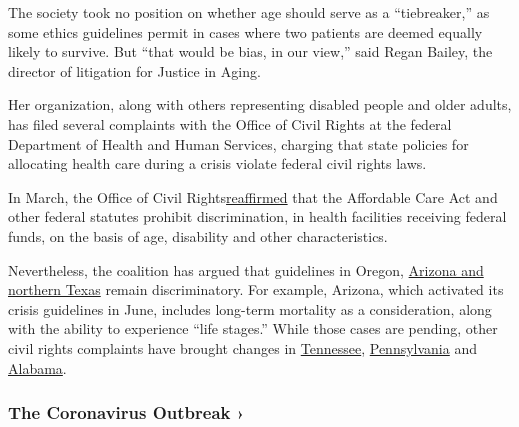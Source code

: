 The society took no position on whether age should serve as a
``tiebreaker,'' as some ethics guidelines permit in cases where two
patients are deemed equally likely to survive. But ``that would be bias,
in our view,'' said Regan Bailey, the director of litigation for Justice
in Aging.

Her organization, along with others representing disabled people and
older adults, has filed several complaints with the Office of Civil
Rights at the federal Department of Health and Human Services, charging
that state policies for allocating health care during a crisis violate
federal civil rights laws.

In March, the Office of Civil
Rights\href{https://www.hhs.gov/about/news/2020/03/28/ocr-issues-bulletin-on-civil-rights-laws-and-hipaa-flexibilities-that-apply-during-the-covid-19-emergency.html}{reaffirmed}
that the Affordable Care Act and other federal statutes prohibit
discrimination, in health facilities receiving federal funds, on the
basis of age, disability and other characteristics.

Nevertheless, the coalition has argued that guidelines in Oregon,
\href{https://www.justiceinaging.org/older-adults-and-people-with-disabilities-challenge-discriminatory-surge-care-guidelines-in-covid-19-hotspots-arizona-and-texas/}{Arizona
and northern Texas} remain discriminatory. For example, Arizona, which
activated its crisis guidelines in June, includes long-term mortality as
a consideration, along with the ability to experience ``life stages.''
While those cases are pending, other civil rights complaints have
brought changes in
\href{https://www.hhs.gov/about/news/2020/06/26/ocr-resolves-complaint-tennessee-after-it-revises-its-triage-plans-protect-against-disability.html}{Tennessee},
\href{https://www.hhs.gov/about/news/2020/04/16/ocr-resolves-civil-rights-complaint-against-pennsylvania-after-it-revises-its-pandemic-health-care.html}{Pennsylvania}
and
\href{https://www.hhs.gov/about/news/2020/04/08/ocr-reaches-early-case-resolution-alabama-after-it-removes-discriminatory-ventilator-triaging.html}{Alabama}.

\href{https://www.nytimes.com/news-event/coronavirus?action=click\&pgtype=Article\&state=default\&region=MAIN_CONTENT_3\&context=storylines_faq}{}

\hypertarget{the-coronavirus-outbreak-}{%
\subsubsection{The Coronavirus Outbreak
›}\label{the-coronavirus-outbreak-}}

